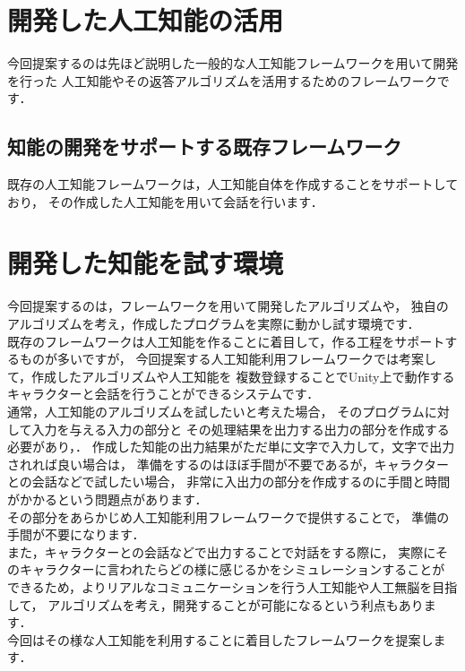 \section{開発した人工知能の活用}
今回提案するのは先ほど説明した一般的な人工知能フレームワークを用いて開発を行った
人工知能やその返答アルゴリズムを活用するためのフレームワークです．
\subsection{知能の開発をサポートする既存フレームワーク}
既存の人工知能フレームワークは，人工知能自体を作成することをサポートしており，
その作成した人工知能を用いて会話を行います．\\
\section{開発した知能を試す環境}
今回提案するのは，フレームワークを用いて開発したアルゴリズムや，
独自のアルゴリズムを考え，作成したプログラムを実際に動かし試す環境です．
\\
既存のフレームワークは人工知能を作ることに着目して，作る工程をサポートするものが多いですが，
今回提案する人工知能利用フレームワークでは考案して，作成したアルゴリズムや人工知能を
複数登録することでUnity上で動作するキャラクターと会話を行うことができるシステムです．
\\
通常，人工知能のアルゴリズムを試したいと考えた場合，
そのプログラムに対して入力を与える入力の部分と
その処理結果を出力する出力の部分を作成する必要があり，．
作成した知能の出力結果がただ単に文字で入力して，文字で出力されれば良い場合は，
準備をするのはほぼ手間が不要であるが，キャラクターとの会話などで試したい場合，
非常に入出力の部分を作成するのに手間と時間がかかるという問題点があります．
\\
その部分をあらかじめ人工知能利用フレームワークで提供することで，
準備の手間が不要になります．
\\
また，キャラクターとの会話などで出力することで対話をする際に，
実際にそのキャラクターに言われたらどの様に感じるかをシミュレーションすることが
できるため，よりリアルなコミュニケーションを行う人工知能や人工無脳を目指して，
アルゴリズムを考え，開発することが可能になるという利点もあります．
\\
今回はその様な人工知能を利用することに着目したフレームワークを提案します．
